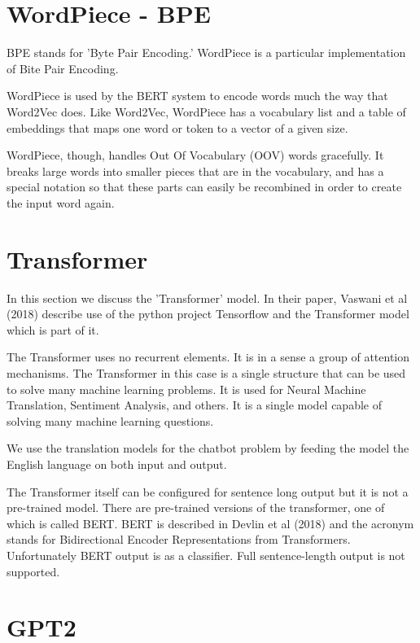 \section{WordPiece - BPE}

BPE stands for 'Byte Pair Encoding.' WordPiece is a particular implementation of Bite Pair Encoding.

WordPiece is used by the BERT system to encode words much the way that Word2Vec does.
Like Word2Vec, WordPiece  has a vocabulary list and a table of embeddings that maps one
word or token to a vector of a given size.

WordPiece, though, handles Out Of Vocabulary (OOV) words gracefully. It breaks large words
into smaller pieces that are in the vocabulary, and has a special notation so that
these parts can easily be recombined in order to create the input word again.


\section{Transformer}

In this section we discuss the 'Transformer' model. In their paper, Vaswani et al (2018)\cite{tensor2tensor} describe use of the python project Tensorflow and the Transformer model which is part of it.

The Transformer uses no recurrent elements. It is in a sense a group of attention mechanisms. The Transformer in this case is a single structure that can be used to solve many machine learning problems. It is used for Neural Machine Translation, Sentiment Analysis, and others. It is a single model capable of solving many machine learning questions.

We use the translation models for the chatbot problem by feeding the model the English language on both input and output. 

The Transformer itself can be configured for sentence long output but it is not a pre-trained model. There are pre-trained versions of the transformer, one of which is called BERT. BERT is described in Devlin et al (2018)\cite{DBLP:journals/corr/abs-1810-04805} and the acronym stands for Bidirectional Encoder Representations from Transformers. Unfortunately BERT output is as a 
classifier. Full sentence-length output is not supported.

\section{GPT2}

